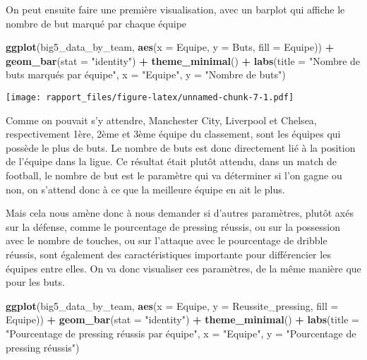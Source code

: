 \documentclass[
]{article}
\newenvironment{Shaded}{\begin{snugshade}}{\end{snugshade}}
\newcommand{\AttributeTok}[1]{\textcolor[rgb]{0.13,0.29,0.53}{#1}}
\newcommand{\FunctionTok}[1]{\textcolor[rgb]{0.13,0.29,0.53}{\textbf{#1}}}
\newcommand{\NormalTok}[1]{#1}
\newcommand{\SpecialCharTok}[1]{\textcolor[rgb]{0.81,0.36,0.00}{\textbf{#1}}}
\newcommand{\StringTok}[1]{\textcolor[rgb]{0.31,0.60,0.02}{#1}}
\begin{document}
On peut ensuite faire une première visualisation, avec un barplot qui
affiche le nombre de but marqué par chaque équipe

\begin{Shaded}
\begin{Highlighting}[]
\FunctionTok{ggplot}\NormalTok{(big5\_data\_by\_team, }\FunctionTok{aes}\NormalTok{(}\AttributeTok{x =}\NormalTok{ Equipe, }\AttributeTok{y =}\NormalTok{ Buts, }\AttributeTok{fill =}\NormalTok{ Equipe)) }\SpecialCharTok{+} \FunctionTok{geom\_bar}\NormalTok{(}\AttributeTok{stat =} \StringTok{"identity"}\NormalTok{) }\SpecialCharTok{+} \FunctionTok{theme\_minimal}\NormalTok{() }\SpecialCharTok{+} \FunctionTok{labs}\NormalTok{(}\AttributeTok{title =} \StringTok{"Nombre de buts marqués par équipe"}\NormalTok{, }\AttributeTok{x =} \StringTok{"Equipe"}\NormalTok{, }\AttributeTok{y =} \StringTok{"Nombre de buts"}\NormalTok{)}
\end{Highlighting}
\end{Shaded}

\texttt{[image: rapport\_files/figure-latex/unnamed-chunk-7-1.pdf]}

Comme on pouvait s'y attendre, Manchester City, Liverpool et Chelsea,
respectivement 1ère, 2ème et 3ème équipe du classement, sont les équipes
qui possède le plus de buts. Le nombre de buts est donc directement lié
à la position de l'équipe dans la ligue. Ce résultat était plutôt
attendu, dans un match de football, le nombre de but est le paramètre
qui va déterminer si l'on gagne ou non, on s'attend donc à ce que la
meilleure équipe en ait le plus.

Mais cela nous amène donc à nous demander si d'autres paramètres, plutôt
axés sur la défense, comme le pourcentage de pressing réussis, ou sur la
possession avec le nombre de touches, ou sur l'attaque avec le
pourcentage de dribble réussis, sont également des caractéristiques
importante pour différencier les équipes entre elles. On va donc
visualiser ces paramètres, de la même manière que pour les buts.

\begin{Shaded}
\begin{Highlighting}[]
\FunctionTok{ggplot}\NormalTok{(big5\_data\_by\_team, }\FunctionTok{aes}\NormalTok{(}\AttributeTok{x =}\NormalTok{ Equipe, }\AttributeTok{y =}\NormalTok{ Reussite\_pressing, }\AttributeTok{fill =}\NormalTok{ Equipe)) }\SpecialCharTok{+} \FunctionTok{geom\_bar}\NormalTok{(}\AttributeTok{stat =} \StringTok{"identity"}\NormalTok{) }\SpecialCharTok{+} \FunctionTok{theme\_minimal}\NormalTok{() }\SpecialCharTok{+} \FunctionTok{labs}\NormalTok{(}\AttributeTok{title =} \StringTok{"Pourcentage de pressing réussis par équipe"}\NormalTok{, }\AttributeTok{x =} \StringTok{"Equipe"}\NormalTok{, }\AttributeTok{y =} \StringTok{"Pourcentage de pressing réussis"}\NormalTok{)}
\end{Highlighting}
\end{Shaded}
\end{document}
